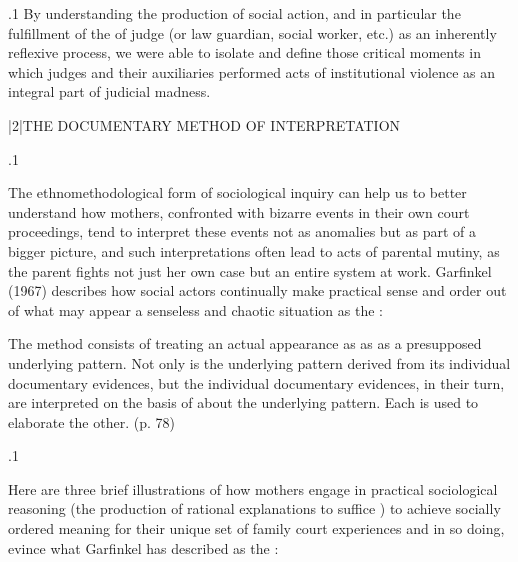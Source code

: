 \documentclass[11pt, twoside]{article}
\begin{document}
{\p.1{%
By understanding the production of social action, and in particular
the fulfillment of the  of judge (or law guardian, social worker,
etc.) as an inherently reflexive process, we were able to isolate and define
those critical moments in which judges and their auxiliaries performed
acts of institutional violence as an integral part of judicial madness.
}%


\s|2|{THE DOCUMENTARY METHOD OF INTERPRETATION}

\p.1{%
The ethnomethodological form of sociological inquiry can help us to
better understand how mothers, confronted with bizarre events in their
own court proceedings, tend to interpret these events not as anomalies
but as part of a bigger picture, and such interpretations often lead to acts
of parental mutiny, as the parent fights not just her own case but an entire
system at work. Garfinkel (1967) describes how social actors continually
make practical sense and order out of what may appear a senseless and
chaotic situation as the :

\begin{blockQuote}
The method consists of treating an actual appearance as  as  as  a presupposed
underlying pattern. Not only is the underlying pattern derived
from its individual documentary evidences, but the individual documentary evidences, in their turn, are interpreted on the basis of
 about the underlying pattern. Each is used to
elaborate the other. (p. 78)
\end{blockQuote}

}%

\p.1{%
Here are three brief illustrations of how mothers engage in practical
sociological reasoning (the production of rational explanations to suffice ) to achieve socially ordered meaning for
their unique set of family court experiences and in so doing, evince what
Garfinkel has described as the :

\begin{docEnumerate}


\end{docEnumerate}}}
\end{document}
